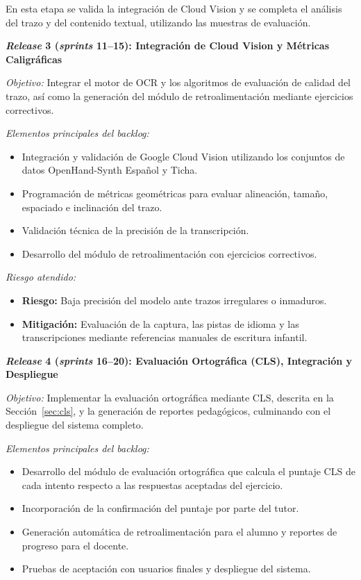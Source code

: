 En esta etapa se valida la integración de Cloud Vision y se completa el análisis del trazo y del contenido textual, utilizando las muestras de evaluación.

\textbf{\textit{Release} 3 (\textit{sprints} 11–15): Integración de Cloud Vision y Métricas Caligráficas}

\textit{Objetivo:} Integrar el motor de OCR y
los algoritmos de evaluación de calidad del trazo, así como la generación del módulo
de retroalimentación mediante ejercicios correctivos.

\textit{Elementos principales del backlog:}
\begin{itemize}
    \item Integración y validación de Google Cloud Vision
    utilizando los conjuntos de datos OpenHand-Synth Español y Ticha.
    \item Programación de métricas geométricas para evaluar alineación, tamaño,
    espaciado e inclinación del trazo.
    \item Validación técnica de la precisión de la transcripción.
    \item Desarrollo del módulo de retroalimentación con ejercicios correctivos.
\end{itemize}

\textit{Riesgo atendido:}
\begin{itemize}
    \item \textbf{Riesgo:} Baja precisión del modelo ante trazos irregulares o
    inmaduros.
    \item \textbf{Mitigación:} Evaluación de la captura, las pistas de idioma y las transcripciones
    mediante referencias manuales de escritura infantil.
\end{itemize}

\textbf{\textit{Release} 4 (\textit{sprints} 16–20): Evaluación Ortográfica (CLS), Integración y Despliegue}

\textit{Objetivo:} Implementar la evaluación ortográfica mediante CLS, descrita en la Sección~\ref{sec:cls}, y la generación de reportes pedagógicos, culminando con el despliegue del sistema completo.

\textit{Elementos principales del backlog:}
\begin{itemize}
    \item Desarrollo del módulo de evaluación ortográfica que calcula el puntaje CLS de
    cada intento respecto a las respuestas aceptadas del ejercicio.
    \item Incorporación de la confirmación del puntaje por parte del tutor.
    \item Generación automática de retroalimentación para el alumno y reportes de
    progreso para el docente.
    \item Pruebas de aceptación con usuarios finales y despliegue del sistema.
\end{itemize}

